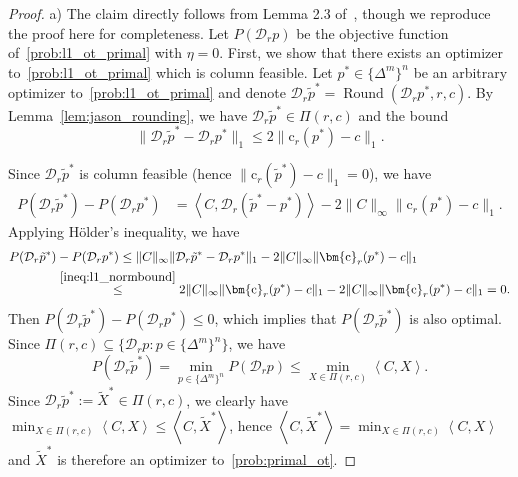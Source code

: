 \documentclass[10pt]{article}
\newcommand{\inner}[2]{\left\langle #1,#2\right\rangle}
\newcommand{\coup}{\Pi}
\newcommand{\diag}[1]{\mathcal{D}_{#1}}
\theoremstyle{plain}
\theoremstyle{definition}
\theoremstyle{remark}
\newcommand{\col}{\bm{\mathrm{c}}}
\begin{document}
\begin{proof}
a) The claim directly follows from Lemma 2.3 of~\cite{jambulapatiDirectTildelbraceOrbrace2019a}, though we reproduce the proof here for completeness. Let $P(\diag{r}p)$ be the objective function of~\eqref{prob:l1_ot_primal} with $\eta =0$. First, we show that there exists an optimizer to~\eqref{prob:l1_ot_primal} which is column feasible. Let $p^*\in\{\Delta^m\}^n$ be an arbitrary optimizer to~\eqref{prob:l1_ot_primal} and denote $\diag{r}\tilde p^*=\operatorname{Round}(\diag{r}p^*, r, c)$.
By Lemma~\ref{lem:jason_rounding}, we have $\diag{r}\tilde p^*\in\coup(r,c)$ and the bound
\begin{equation}\label{ineq:l1_normbound}
    \|\diag{r}\tilde p^* - \diag{r}p^*\|_1\leq 2\|\col_r(p^*) - c\|_1.
\end{equation}

Since $\diag{r}\tilde p^*$ is column feasible (hence $\|\col_r(\tilde p^*)-c\|_1=0$), we have
\begin{align*}
    P(\diag{r}\tilde p^*)-P(\diag{r}p^*) &= \inner{C}{\diag{r}(\tilde p^*-p^*)}-2\|C\|_\infty\|\col_r(p^*) - c\|_1.
\end{align*}
Applying H\"{o}lder's inequality, we have
\begin{align*}
    P(\diag{r}\tilde p^*)&-P(\diag{r}p^*)\leq \|C\|_\infty\|\diag{r}\tilde p^*-\diag{r}p^*\|_1-2\|C\|_\infty\|\col_r(p^*) - c\|_1\\
    &\stackrel{\eqref{ineq:l1_normbound}}{\leq} 2\|C\|_\infty\|\col_r(p^*) - c\|_1-2\|C\|_\infty\|\col_r(p^*) - c\|_1=0.
\end{align*}
Then $P(\diag{r}\tilde p^*)-P(\diag{r}p^*)\leq 0$, which implies that $P(\diag{r}\tilde p^*)$ is also optimal. Since $\coup(r,c)\subseteq\{\diag{r}p:p\in\{\Delta^m\}^n\}$, we have
\[P(\diag{r}\tilde p^*)=\min_{p\in\{\Delta^m\}^n}P(\diag{r}p)\leq \min_{X\in\coup(r,c)}\inner{C}{X}.\]
Since $\diag{r}\tilde p^*:=\tilde X^*\in \coup(r,c)$, we clearly have $\min_{X\in\coup(r,c)}\inner{C}{X}\leq \inner{C}{\tilde X^*}$, hence $\inner{C}{\tilde X^*}=\min_{X\in\coup(r,c)}\inner{C}{X}$
and $\tilde X^*$ is therefore an optimizer to~\eqref{prob:primal_ot}.



\end{proof}
\end{document}
